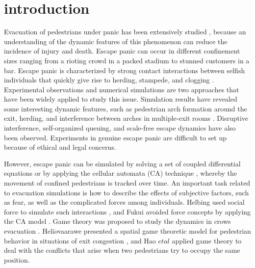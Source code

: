 \documentclass[%
 reprint,
 amsmath,amssymb,
 aps,
]{revtex4-1}
\begin{document}
\maketitle


\section{\label{sec:level1}introduction}

Evacuation of pedestrians under panic has been extensively studied \cite{model1,model2,model3,model4,model5,model6,model7,model8,model9,model10, model11, model12, model13, model14, model15, model16, model17, model18, model19, ca}, because an understanding of the dynamic features of this phenomenon can reduce the incidence of injury and death. Escape panic can occur in different confinement sizes ranging from a rioting crowd in a packed stadium to stunned customers in a bar. Escape panic is characterized by strong contact interactions between selfish individuals that quickly give rise to herding, stampede, and clogging \cite{feature1, feature2, feature3, feature4, feature5,feature6, feature7, feature8, feature9, feature10, feature11}. Experimental observations and numerical simulations are two approaches that have been widely applied to study this issue. Simulation results have revealed some interesting dynamic features, such as pedestrian arch formation around the exit, herding, and interference between arches in multiple-exit rooms \cite{model2}. Disruptive interference, self-organized queuing, and scale-free escape dynamics \cite{feature6, feature7} have also been observed. Experiments in genuine escape panic are difficult to set up because of ethical and legal concerns.

However, escape panic can be simulated by solving a set of coupled differential equations \cite{model2,model3} or by applying the cellular automata (CA) technique \cite{ca, feature6}, whereby the movement of confined pedestrians is tracked over time. An important task related to evacuation simulations is how to describe the effects of subjective factors, such as fear, as well as the complicated forces among individuals. Helbing used social force to simulate such interactions \cite{model2}, and Fukui avoided force concepts by applying the CA model \cite{ca}. Game theory was proposed to study the dynamics in crows evacuation \cite{game1, game2, game3, game4, game5, game6}. Heli$\ddot{o}$vaarawe presented a spatial game theoretic model for pedestrian behavior in situations of exit congestion \cite{game1}, and  Hao $etal$ applied game theory to deal with the conflicts that arise when two pedestrians try to occupy the same position\cite{game6}.
\end{document}
